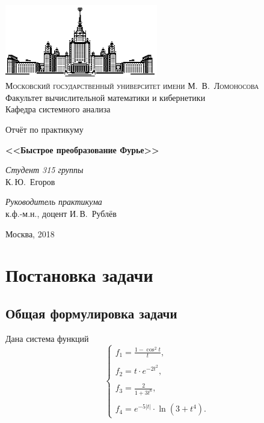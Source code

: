 \documentclass[a4paper, 11pt]{article}
\begin{document}
\thispagestyle{empty}
\begin{center}
\ \vspace{-3cm}

\includegraphics[width=0.5\textwidth]{img/msu.eps}\\

{\scshape Московский государственный университет имени М.~В.~Ломоносова}\\
Факультет вычислительной математики и кибернетики\\
Кафедра системного анализа

\vfill

{\LARGE Отчёт по практикуму}

\vspace{1cm}

{\Huge\bfseries <<Быстрое преобразование Фурье>>}
\end{center}
\vspace{3cm}
\begin{flushright}
  \large
  \textit{Студент 315 группы}\\
  К.\,Ю.~Егоров

  \vspace{5mm}

  \textit{Руководитель практикума}\\
  к.ф.-м.н., доцент И.\,В.~Рублёв
\end{flushright}
\vfill
\begin{center}
Москва, 2018
\end{center}
\clearpage


\tableofcontents
\clearpage

\clearpage
\section{Постановка задачи}

    \subsection{Общая формулировка задачи}
        
        Дана система функций
        \begin{equation} \label{eq:system}
            \begin{cases} 
                f_1 = \frac{1 - \cos^2t}{t},   \\ \\
                f_2 = t \cdot e^{-2t^2},      \\ \\
                f_3 = \frac{2}{1+3t^6},       \\ \\
                f_4 = e^{-5|t|}\cdot \ln(3+t^4). 
            \end{cases}
        \end{equation}
        
\end{document}
